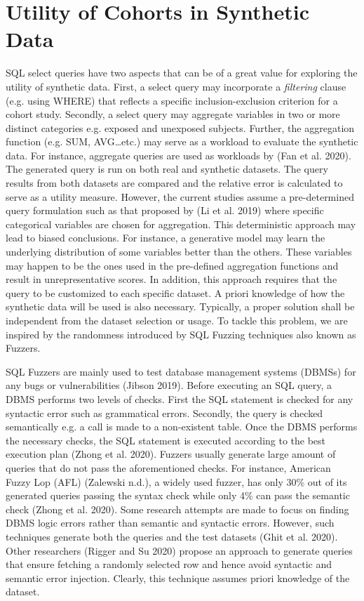 \hypertarget{utility-of-cohorts-in-synthetic-data}{%
\section{Utility of Cohorts in Synthetic
Data}\label{utility-of-cohorts-in-synthetic-data}}

SQL select queries have two aspects that can be of a great value for
exploring the utility of synthetic data. First, a select query may
incorporate a \emph{filtering} clause (e.g. using WHERE) that reflects a
specific inclusion-exclusion criterion for a cohort study. Secondly, a
select query may aggregate variables in two or more distinct categories
e.g. exposed and unexposed subjects. Further, the aggregation function
(e.g. SUM, AVG\ldots{}etc.) may serve as a workload to evaluate the
synthetic data. For instance, aggregate queries are used as workloads by
(Fan et al. 2020). The generated query is run on both real and synthetic
datasets. The query results from both datasets are compared and the
relative error is calculated to serve as a utility measure. However, the
current studies assume a pre-determined query formulation such as that
proposed by (Li et al. 2019) where specific categorical variables are
chosen for aggregation. This deterministic approach may lead to biased
conclusions. For instance, a generative model may learn the underlying
distribution of some variables better than the others. These variables
may happen to be the ones used in the pre-defined aggregation functions
and result in unrepresentative scores. In addition, this approach
requires that the query to be customized to each specific dataset. A
priori knowledge of how the synthetic data will be used is also
necessary. Typically, a proper solution shall be independent from the
dataset selection or usage. To tackle this problem, we are inspired by
the randomness introduced by SQL Fuzzing techniques also known as
Fuzzers.

SQL Fuzzers are mainly used to test database management systems (DBMSs)
for any bugs or vulnerabilities (Jibson 2019). Before executing an SQL
query, a DBMS performs two levels of checks. First the SQL statement is
checked for any syntactic error such as grammatical errors. Secondly,
the query is checked semantically e.g. a call is made to a non-existent
table. Once the DBMS performs the necessary checks, the SQL statement is
executed according to the best execution plan (Zhong et al. 2020).
Fuzzers usually generate large amount of queries that do not pass the
aforementioned checks. For instance, American Fuzzy Lop (AFL) (Zalewski
n.d.), a widely used fuzzer, has only 30\% out of its generated queries
passing the syntax check while only 4\% can pass the semantic check
(Zhong et al. 2020). Some research attempts are made to focus on finding
DBMS logic errors rather than semantic and syntactic errors. However,
such techniques generate both the queries and the test datasets (Ghit et
al. 2020). Other researchers (Rigger and Su 2020) propose an approach to
generate queries that ensure fetching a randomly selected row and hence
avoid syntactic and semantic error injection. Clearly, this technique
assumes priori knowledge of the dataset.


